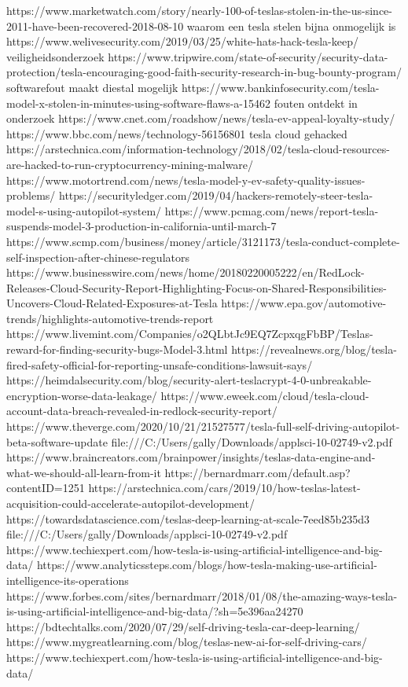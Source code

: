 https://www.marketwatch.com/story/nearly-100-of-teslas-stolen-in-the-us-since-2011-have-been-recovered-2018-08-10
waarom een tesla stelen bijna onmogelijk is
https://www.welivesecurity.com/2019/03/25/white-hats-hack-tesla-keep/
veiligheidsonderzoek
https://www.tripwire.com/state-of-security/security-data-protection/tesla-encouraging-good-faith-security-research-in-bug-bounty-program/
softwarefout maakt diestal mogelijk
https://www.bankinfosecurity.com/tesla-model-x-stolen-in-minutes-using-software-flaws-a-15462
fouten ontdekt in onderzoek
https://www.cnet.com/roadshow/news/tesla-ev-appeal-loyalty-study/
https://www.bbc.com/news/technology-56156801
tesla cloud gehacked
https://arstechnica.com/information-technology/2018/02/tesla-cloud-resources-are-hacked-to-run-cryptocurrency-mining-malware/
https://www.motortrend.com/news/tesla-model-y-ev-safety-quality-issues-problems/
https://securityledger.com/2019/04/hackers-remotely-steer-tesla-model-s-using-autopilot-system/
https://www.pcmag.com/news/report-tesla-suspends-model-3-production-in-california-until-march-7
https://www.scmp.com/business/money/article/3121173/tesla-conduct-complete-self-inspection-after-chinese-regulators
https://www.businesswire.com/news/home/20180220005222/en/RedLock-Releases-Cloud-Security-Report-Highlighting-Focus-on-Shared-Responsibilities-Uncovers-Cloud-Related-Exposures-at-Tesla
https://www.epa.gov/automotive-trends/highlights-automotive-trends-report
https://www.livemint.com/Companies/o2QLbtJc9EQ7ZcpxqgFbBP/Teslas-reward-for-finding-security-bugs-Model-3.html
https://revealnews.org/blog/tesla-fired-safety-official-for-reporting-unsafe-conditions-lawsuit-says/
https://heimdalsecurity.com/blog/security-alert-teslacrypt-4-0-unbreakable-encryption-worse-data-leakage/
https://www.eweek.com/cloud/tesla-cloud-account-data-breach-revealed-in-redlock-security-report/
https://www.theverge.com/2020/10/21/21527577/tesla-full-self-driving-autopilot-beta-software-update
file:///C:/Users/gally/Downloads/applsci-10-02749-v2.pdf
https://www.braincreators.com/brainpower/insights/teslas-data-engine-and-what-we-should-all-learn-from-it
https://bernardmarr.com/default.asp?contentID=1251
https://arstechnica.com/cars/2019/10/how-teslas-latest-acquisition-could-accelerate-autopilot-development/
https://towardsdatascience.com/teslas-deep-learning-at-scale-7eed85b235d3
file:///C:/Users/gally/Downloads/applsci-10-02749-v2.pdf
https://www.techiexpert.com/how-tesla-is-using-artificial-intelligence-and-big-data/
https://www.analyticssteps.com/blogs/how-tesla-making-use-artificial-intelligence-its-operations
https://www.forbes.com/sites/bernardmarr/2018/01/08/the-amazing-ways-tesla-is-using-artificial-intelligence-and-big-data/?sh=5e396aa24270
https://bdtechtalks.com/2020/07/29/self-driving-tesla-car-deep-learning/
https://www.mygreatlearning.com/blog/teslas-new-ai-for-self-driving-cars/
https://www.techiexpert.com/how-tesla-is-using-artificial-intelligence-and-big-data/






